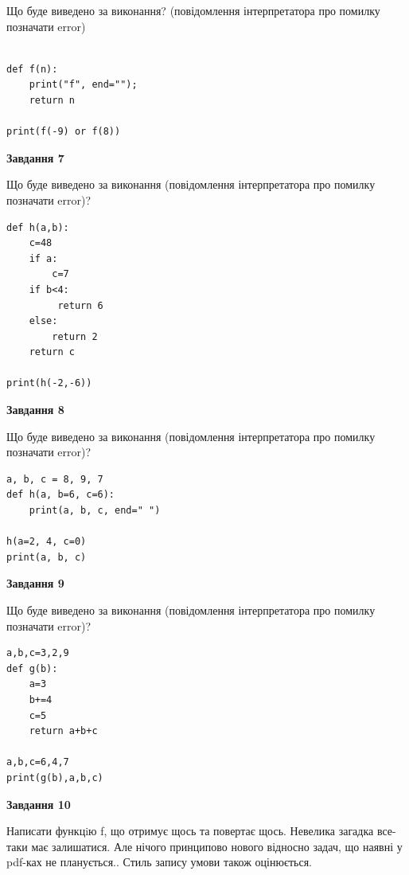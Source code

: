 \documentclass[12pt, ukrainian]{article}
\begin{document}
{\begin {large}
Що буде виведено за виконання? (повідомлення інтерпретатора про помилку позначати error)\par
\begin{verbatim}

def f(n):
    print("f", end="");
    return n

print(f(-9) or f(8))
\end{verbatim}

{\begin {center}\textbf{Завдання 7}\end {center}}

Що буде виведено за виконання (повідомлення інтерпретатора про помилку позначати error)?\par
\begin{verbatim}
def h(a,b):
    c=48
    if a:
        c=7
    if b<4:
         return 6
    else: 
        return 2
    return c

print(h(-2,-6))
\end{verbatim}

{\begin {center}\textbf{Завдання 8}\end {center}}

Що буде виведено за виконання (повідомлення інтерпретатора про помилку позначати error)?\par
\begin{verbatim}
a, b, c = 8, 9, 7
def h(a, b=6, c=6):
    print(a, b, c, end=" ")

h(a=2, 4, c=0)
print(a, b, c)
\end{verbatim}

{\begin {center}\textbf{Завдання 9}\end {center}}

Що буде виведено за виконання (повідомлення інтерпретатора про помилку позначати error)?\par
\begin{verbatim}
a,b,c=3,2,9
def g(b):
    a=3
    b+=4
    c=5
    return a+b+c

a,b,c=6,4,7
print(g(b),a,b,c)
\end{verbatim}

{\begin {center}\textbf{Завдання 10}\end {center}}


Написати функцiю f, що отримує щось та повертає щось. Невелика загадка все-таки має залишатися. Але нічого принципово нового відносно задач, що наявні у pdf-ках не планується.. Стиль запису умови також оцінюється.\par
\end {large}}
\newpage
\end{document}

